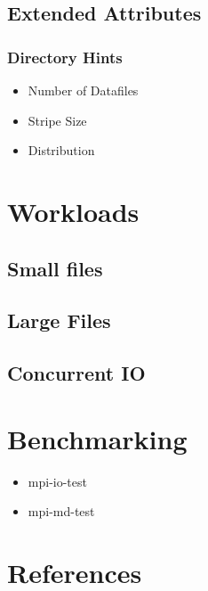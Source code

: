 \documentclass[11pt,letterpaper]{article}
\begin{document}
\subsection{Extended Attributes}

\subsubsection{Directory Hints}

\begin{itemize}
\item Number of Datafiles
\item Stripe Size
\item Distribution
\end{itemize}

\section{Workloads}

\subsection{Small files}
\subsection{Large Files}
\subsection{Concurrent IO}

\section{Benchmarking}

\begin{itemize}
\item  mpi-io-test
\item  mpi-md-test
\end{itemize}

\section{References}
\end{document}
